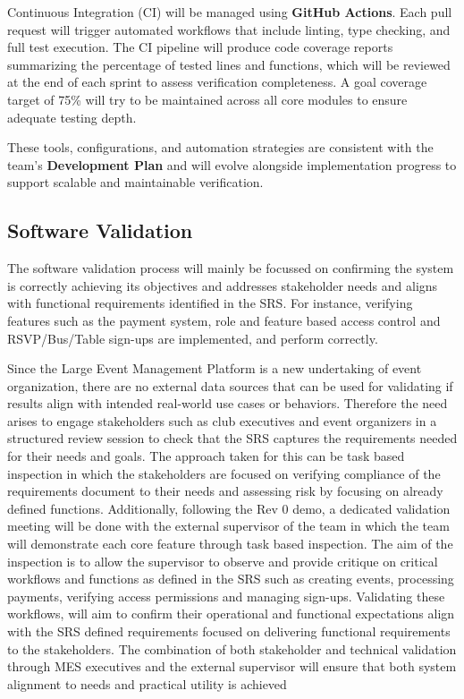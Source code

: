 \documentclass[12pt, titlepage]{article}
\begin{document}
Continuous Integration (CI) will be managed using \textbf{GitHub Actions}. Each pull request will trigger automated workflows that include linting, type checking, and full test execution. The CI pipeline will produce code coverage reports summarizing the percentage of tested lines and functions, which will be reviewed at the end of each sprint to assess verification completeness. A goal coverage target of 75\% will try to be maintained across all core modules to ensure adequate testing depth.

These tools, configurations, and automation strategies are consistent with the team’s \textbf{Development Plan} and will evolve alongside implementation progress to support scalable and maintainable verification.

\subsection{Software Validation}
The software validation process will mainly be focussed on confirming the system is correctly achieving its objectives and addresses stakeholder needs and aligns with functional requirements identified in the SRS. For instance, verifying features such as the payment system, role and feature based access control and RSVP/Bus/Table sign-ups are implemented, and perform correctly. 

Since the Large Event Management Platform is a new undertaking of event organization, there are no external data sources that can be used for validating if results align with intended real-world use cases or behaviors. Therefore the need arises to engage stakeholders such as club executives and event organizers in a structured review session to check that the SRS captures the requirements needed for their needs and goals. The approach taken for this can be task based inspection in which the stakeholders are focused on verifying compliance of the requirements document to their needs and assessing risk by focusing on already defined functions. Additionally, following the Rev 0 demo, a dedicated validation meeting will be done with the external supervisor of the team in which the team will demonstrate each core feature through task based inspection. The aim of the inspection is to allow the supervisor to observe and provide critique on critical workflows and functions as defined in the SRS such as creating events, processing payments, verifying access permissions and managing sign-ups. Validating these workflows, will aim to confirm their operational and functional expectations align with the SRS defined requirements focused on delivering functional requirements to the stakeholders. The combination of both stakeholder and technical validation through MES executives and the external supervisor will ensure that both system alignment to needs and practical utility is achieved
\end{document}
